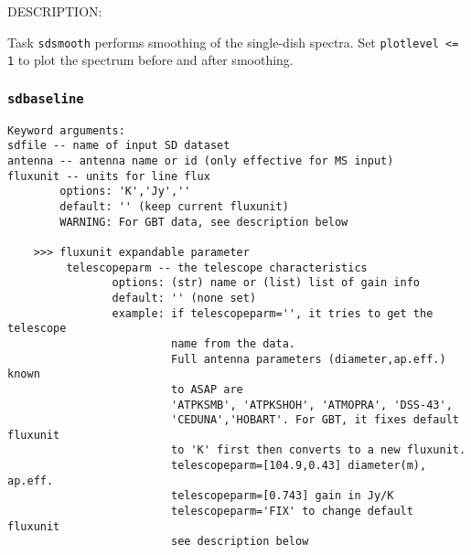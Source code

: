     DESCRIPTION:

    Task {\tt sdsmooth} performs smoothing of the single-dish spectra.
    Set {\tt plotlevel <= 1} to plot the spectrum before and after smoothing.
    
%    
 
\subsubsection{{\tt sdbaseline}}
\label{section:sd.sdtasks.tasks.sdbaseline}

\begin{verbatim}
Keyword arguments:
sdfile -- name of input SD dataset
antenna -- antenna name or id (only effective for MS input)
fluxunit -- units for line flux
        options: 'K','Jy',''
        default: '' (keep current fluxunit)
        WARNING: For GBT data, see description below
        
    >>> fluxunit expandable parameter
         telescopeparm -- the telescope characteristics
                options: (str) name or (list) list of gain info
                default: '' (none set)
                example: if telescopeparm='', it tries to get the telescope
                         name from the data.
                         Full antenna parameters (diameter,ap.eff.) known
                         to ASAP are
                         'ATPKSMB', 'ATPKSHOH', 'ATMOPRA', 'DSS-43',
                         'CEDUNA','HOBART'. For GBT, it fixes default fluxunit
                         to 'K' first then converts to a new fluxunit.
                         telescopeparm=[104.9,0.43] diameter(m), ap.eff.
                         telescopeparm=[0.743] gain in Jy/K
                         telescopeparm='FIX' to change default fluxunit
                         see description below


\end{verbatim}

